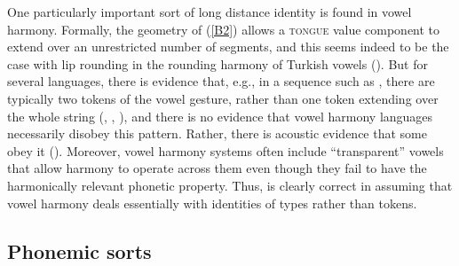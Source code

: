 \documentclass[output=paper]{langsci/langscibook}
\begin{document}
One particularly important sort of long distance identity is found in
vowel harmony. Formally, the geometry of (\ref{B2}) allows a \textsc{tongue}
value component to extend over an unrestricted number of segments, and this
seems indeed to be the case with lip rounding in the rounding harmony of
Turkish vowels (\citealt{boyc:90}). But for several
languages, there is evidence that, e.g., in a sequence such as
\textipa{[ipi]}, there are typically two tokens of the vowel gesture,
rather than one token extending over the whole string
(\citealt[137]{gay:81},
\citealt[12]{bel:har:81},
\citealt{mca:eng:91}), and there
is no evidence that vowel harmony languages necessarily disobey this
pattern.  Rather, there is acoustic evidence that some obey it
(\citealt{bess:98}).  Moreover, vowel harmony systems
often include ``transparent'' vowels that allow harmony to operate across
them even though they fail to have the harmonically relevant phonetic
property.  Thus, \cite[223]{scob:97} is clearly
correct in assuming that vowel harmony deals essentially with identities of
types rather than tokens.



\subsection{Phonemic sorts}
\label{sec:1.2.5}

\end{document}
